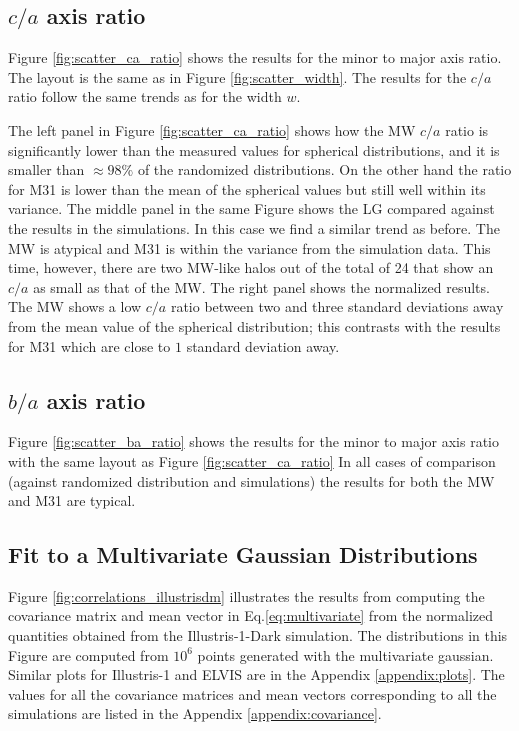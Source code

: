 \documentclass[a4paper,fleqn,usenatbib]{mnras}
\begin{document}
\subsection{$c/a$ axis ratio}

Figure \ref{fig:scatter_ca_ratio} shows the results for the minor to
major axis ratio. 
The layout is the same as in Figure \ref{fig:scatter_width}.
The results for the $c/a$ ratio follow the same trends as for the
width $w$.

The left panel in Figure \ref{fig:scatter_ca_ratio} shows how the MW
$c/a$ ratio is significantly lower than the measured values for
spherical distributions, and it is smaller than $\approx 98\%$ of the
randomized distributions.   
On the other hand the ratio for M31 is lower than the mean of the
spherical values but still well within its variance.
The middle panel in the same Figure shows the LG compared against the
results in the simulations. 
In this case we find a similar trend as before. 
The MW is atypical and M31 is within the variance from the simulation data.
This time, however, there are two MW-like halos out of the total
of 24 that show an $c/a$ as small as that of the MW.
The right panel shows the normalized results. 
The MW shows a low $c/a$ ratio between two and three
standard deviations away from the mean value of the spherical
distribution; this contrasts with the results for M31 which are close to
$1$ standard deviation away. 


\subsection{$b/a$ axis ratio}

Figure \ref{fig:scatter_ba_ratio} shows the results for the minor to
major axis ratio with the same layout as Figure \ref{fig:scatter_ca_ratio}
In all cases of comparison (against randomized distribution
and simulations) the results for both the MW and M31 are typical. 


\subsection{Fit to a Multivariate Gaussian Distributions}

Figure \ref{fig:correlations_illustrisdm} illustrates the results from
 computing the covariance matrix and mean vector in
 Eq.\ref{eq:multivariate} from the normalized quantities obtained from
 the Illustris-1-Dark simulation.
The distributions in this Figure are computed from $10^6$ points
generated with the multivariate gaussian. 
Similar plots for Illustris-1 and ELVIS are in the Appendix \ref{appendix:plots}.
The values for all the covariance matrices and mean vectors
corresponding to all the simulations are listed in the Appendix \ref{appendix:covariance}.
\end{document}
